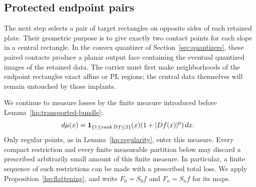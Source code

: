 \subsection{Protected endpoint pairs}

The next step selects a pair of target rectangles on opposite sides of
each retained plate.  Their geometric purpose is to give exactly two
contact points for each slope in a central rectangle.  In the convex
quantizer of Section~\ref{sec:quantizers}, these paired contacts produce
a planar output face containing the eventual quantized images of the
retained data.  The carrier must
first make neighborhoods of the endpoint rectangles exact affine or
PL regions; the central data themselves will remain untouched by those
implants.

We continue to measure losses by the finite measure introduced before
Lemma~\ref{hp:transported-bundle}:
\[
 d\mu(x)=\mathbf 1_{\{1\leq\operatorname{rank} Df\leq2\}}(x)
             (1+|Df(x)|^p)\,dx.
\]
Only regular points, as in Lemma~\ref{hp:regularity}, enter this measure.
Every compact restriction and every finite measurable partition below may
discard a prescribed arbitrarily small amount of this finite measure.
In particular, a finite sequence of such restrictions can be made with a
prescribed total loss.  We apply Proposition~\ref{hp:flattening}, and write
$F_0=S_0f$ and $F_\kappa=S_\kappa f$ for its maps.

